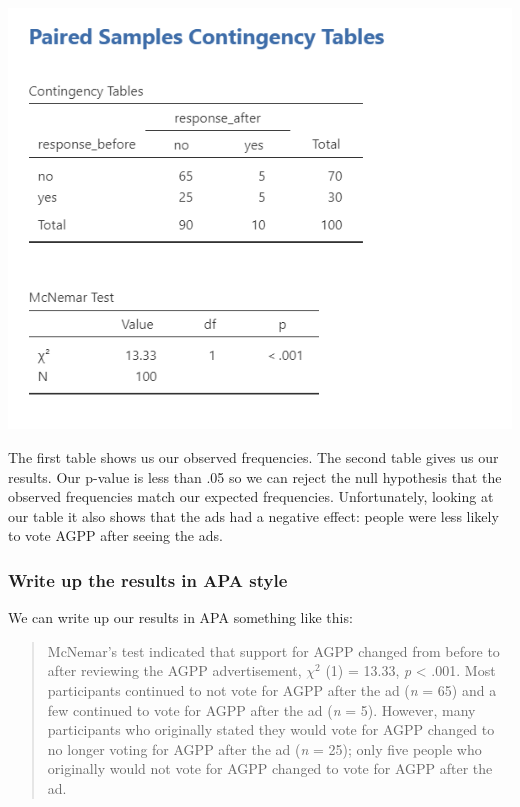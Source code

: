\documentclass[
]{book}
\begin{document}
\includegraphics{images/12-mcnemar/mcnemar_results.png}

The first table shows us our observed frequencies. The second table gives us our results. Our p-value is less than .05 so we can reject the null hypothesis that the observed frequencies match our expected frequencies. Unfortunately, looking at our table it also shows that the ads had a negative effect: people were less likely to vote AGPP after seeing the ads.

\hypertarget{write-up-the-results-in-apa-style-5}{%
\subsubsection{Write up the results in APA style}\label{write-up-the-results-in-apa-style-5}}

We can write up our results in APA something like this:

\begin{quote}
McNemar's test indicated that support for AGPP changed from before to after reviewing the AGPP advertisement, \(\chi^2\) (1) = 13.33, \emph{p} \textless{} .001. Most participants continued to not vote for AGPP after the ad (\emph{n} = 65) and a few continued to vote for AGPP after the ad (\emph{n} = 5). However, many participants who originally stated they would vote for AGPP changed to no longer voting for AGPP after the ad (\emph{n} = 25); only five people who originally would not vote for AGPP changed to vote for AGPP after the ad.
\end{quote}
\end{document}
